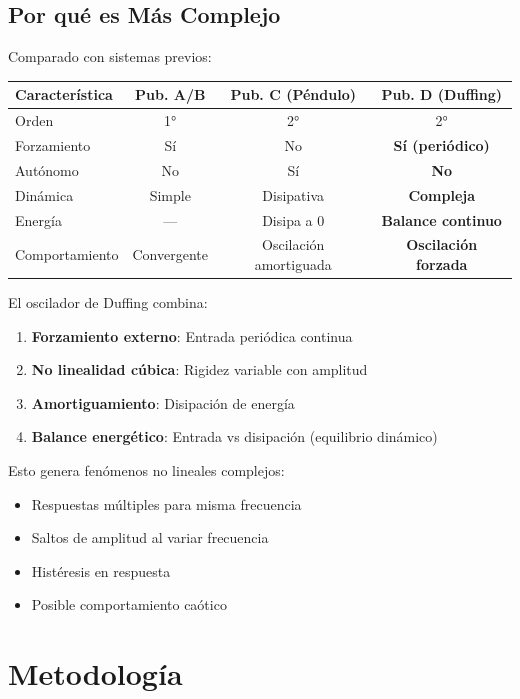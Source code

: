 \documentclass[11pt,a4paper]{article}
\begin{document}
\subsection{Por qué es Más Complejo}

Comparado con sistemas previos:

\begin{table}[H]
\centering
\small
\begin{tabular}{lccc}
\toprule
\textbf{Característica} & \textbf{Pub. A/B} & \textbf{Pub. C (Péndulo)} & \textbf{Pub. D (Duffing)} \\
\midrule
Orden & 1° & 2° & 2° \\
Forzamiento & Sí & No & \textbf{Sí (periódico)} \\
Autónomo & No & Sí & \textbf{No} \\
Dinámica & Simple & Disipativa & \textbf{Compleja} \\
Energía & --- & Disipa a 0 & \textbf{Balance continuo} \\
Comportamiento & Convergente & Oscilación amortiguada & \textbf{Oscilación forzada} \\
\bottomrule
\end{tabular}
\end{table}

El oscilador de Duffing combina:
\begin{enumerate}
\item \textbf{Forzamiento externo}: Entrada periódica continua
\item \textbf{No linealidad cúbica}: Rigidez variable con amplitud
\item \textbf{Amortiguamiento}: Disipación de energía
\item \textbf{Balance energético}: Entrada vs disipación (equilibrio dinámico)
\end{enumerate}

Esto genera fenómenos no lineales complejos:
\begin{itemize}
\item Respuestas múltiples para misma frecuencia
\item Saltos de amplitud al variar frecuencia
\item Histéresis en respuesta
\item Posible comportamiento caótico
\end{itemize}

\section{Metodología}
\end{document}
